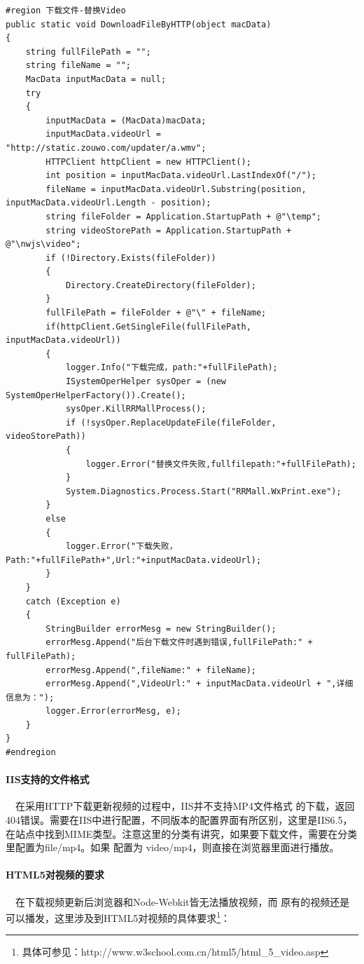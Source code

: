 \documentclass{book}
\begin{document}
\begin{lstlisting}
#region 下载文件-替换Video
public static void DownloadFileByHTTP(object macData)
{
    string fullFilePath = "";
    string fileName = "";
    MacData inputMacData = null;
    try
    {
        inputMacData = (MacData)macData;
        inputMacData.videoUrl = "http://static.zouwo.com/updater/a.wmv";
        HTTPClient httpClient = new HTTPClient();
        int position = inputMacData.videoUrl.LastIndexOf("/");
        fileName = inputMacData.videoUrl.Substring(position, inputMacData.videoUrl.Length - position);
        string fileFolder = Application.StartupPath + @"\temp";
        string videoStorePath = Application.StartupPath + @"\nwjs\video";
        if (!Directory.Exists(fileFolder))
        {
            Directory.CreateDirectory(fileFolder);
        }
        fullFilePath = fileFolder + @"\" + fileName;
        if(httpClient.GetSingleFile(fullFilePath, inputMacData.videoUrl))
        {
            logger.Info("下载完成，path:"+fullFilePath);
            ISystemOperHelper sysOper = (new SystemOperHelperFactory()).Create();
            sysOper.KillRRMallProcess();
            if (!sysOper.ReplaceUpdateFile(fileFolder, videoStorePath))
            {
                logger.Error("替换文件失败,fullfilepath:"+fullFilePath);
            }
            System.Diagnostics.Process.Start("RRMall.WxPrint.exe");
        }
        else
        {
            logger.Error("下载失败，Path:"+fullFilePath+",Url:"+inputMacData.videoUrl);
        }
    }
    catch (Exception e)
    {
        StringBuilder errorMesg = new StringBuilder();
        errorMesg.Append("后台下载文件时遇到错误,fullFilePath:" + fullFilePath);
        errorMesg.Append(",fileName:" + fileName);
        errorMesg.Append(",VideoUrl:" + inputMacData.videoUrl + ",详细信息为：");
        logger.Error(errorMesg, e);
    }
}
#endregion
\end{lstlisting}

\paragraph{IIS支持的文件格式}~~在采用HTTP下载更新视频的过程中，IIS并不支持MP4文件格式
的下载，返回404错误。需要在IIS中进行配置，不同版本的配置界面有所区别，这里是IIS6.5，在站点中找到MIME类型。注意这里的分类有讲究，如果要下载文件，需要在分类里配置为file/mp4。如果 配置为
video/mp4，则直接在浏览器里面进行播放。

\paragraph{HTML5对视频的要求}~~在下载视频更新后浏览器和Node-Webkit皆无法播放视频，而
原有的视频还是可以播发，这里涉及到HTML5对视频的具体要求\footnote{具体可参见：http://www.w3school.com.cn/html5/html\_5\_video.asp}：
\end{document}
